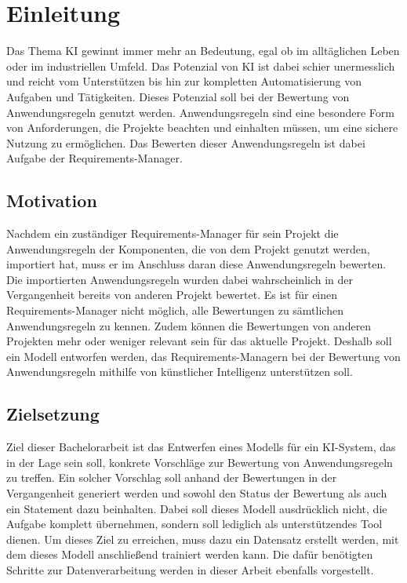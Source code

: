 \chapter{Einleitung}
\label{chap:einleitung}
Das Thema \ac{KI} gewinnt immer mehr an Bedeutung, egal ob im alltäglichen Leben oder im industriellen Umfeld. Das Potenzial von \ac{KI} ist dabei 
schier unermesslich und reicht vom Unterstützen bis hin zur kompletten Automatisierung von Aufgaben und Tätigkeiten. Dieses Potenzial soll bei der Bewertung von Anwendungsregeln genutzt werden.
Anwendungsregeln sind eine besondere Form von Anforderungen, die Projekte beachten und einhalten müssen, um eine sichere Nutzung zu ermöglichen.
Das Bewerten dieser Anwendungsregeln ist dabei Aufgabe der Requirements-Manager.  

\section{Motivation}
\label{chap:Motivation}
Nachdem ein zuständiger Requirements-Manager für sein Projekt die Anwendungsregeln der Komponenten, die von dem Projekt genutzt werden, importiert hat, muss er im Anschluss daran
diese Anwendungsregeln bewerten. Die importierten Anwendungsregeln wurden dabei wahrscheinlich in der Vergangenheit bereits von anderen Projekt bewertet. 
Es ist für einen Requirements-Manager nicht möglich, alle Bewertungen zu sämtlichen Anwendungsregeln zu kennen. Zudem können die Bewertungen von anderen Projekten mehr oder weniger relevant 
sein für das aktuelle Projekt. Deshalb soll ein Modell entworfen werden, das Requirements-Managern bei der Bewertung von Anwendungsregeln mithilfe von künstlicher Intelligenz unterstützen soll.

\section{Zielsetzung}
\label{chap:Zielsetzung}
Ziel dieser Bachelorarbeit ist das Entwerfen eines Modells für ein KI-System, das in der Lage sein soll, konkrete Vorschläge zur Bewertung von Anwendungsregeln zu treffen.
Ein solcher Vorschlag soll anhand der Bewertungen in der Vergangenheit generiert werden und sowohl den Status der Bewertung als auch ein Statement dazu beinhalten.
Dabei soll dieses Modell ausdrücklich nicht, die Aufgabe komplett übernehmen, sondern soll lediglich als unterstützendes Tool dienen. 
Um dieses Ziel zu erreichen, muss dazu ein Datensatz erstellt werden, mit dem dieses Modell anschließend trainiert werden kann. Die dafür benötigten Schritte zur 
Datenverarbeitung werden in dieser Arbeit ebenfalls vorgestellt. 

